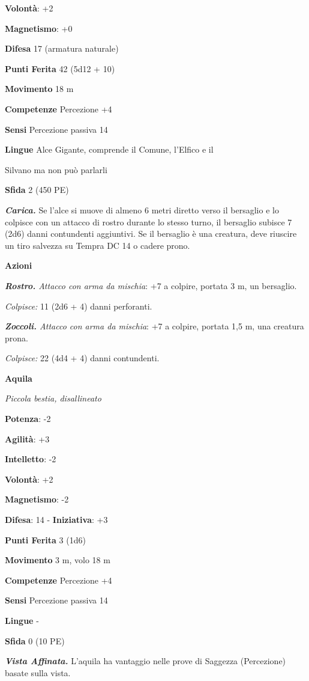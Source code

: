\begin{multicols}{2}
\textbf{Volontà}: +2

\textbf{Magnetismo}: +0

\textbf{Difesa} 17 (armatura naturale)

\textbf{Punti Ferita} 42 (5d12 + 10)

\textbf{Movimento} 18 m

\textbf{Competenze} Percezione +4

\textbf{Sensi} Percezione passiva 14

\textbf{Lingue} Alce Gigante, comprende il Comune, l'Elfico e il

Silvano ma non può parlarli

\textbf{Sfida} 2 (450 PE)

\emph{\textbf{Carica.}} Se l'alce si muove di almeno 6 metri diretto
verso il bersaglio e lo colpisce con un attacco di rostro durante lo
stesso turno, il bersaglio subisce 7 (2d6) danni contundenti aggiuntivi.
Se il bersaglio è una creatura, deve riuscire un tiro salvezza su Tempra
DC 14 o cadere prono.

\textbf{Azioni}

\emph{\textbf{Rostro.} Attacco con arma da mischia}: +7 a colpire,
portata 3 m, un bersaglio.

\emph{Colpisce:} 11 (2d6 + 4) danni perforanti.

\emph{\textbf{Zoccoli.} Attacco con arma da mischia}: +7 a colpire,
portata 1,5 m, una creatura prona.

\emph{Colpisce:} 22 (4d4 + 4) danni contundenti.

\textbf{Aquila}

\emph{Piccola bestia, disallineato}

\textbf{Potenza}: -2

\textbf{Agilità}: +3

\textbf{Intelletto}: -2

\textbf{Volontà}: +2

\textbf{Magnetismo}: -2

\textbf{Difesa}: 14 - \textbf{Iniziativa}: +3

\textbf{Punti Ferita} 3 (1d6)

\textbf{Movimento} 3 m, volo 18 m

\textbf{Competenze} Percezione +4

\textbf{Sensi} Percezione passiva 14

\textbf{Lingue} -

\textbf{Sfida} 0 (10 PE)

\emph{\textbf{Vista Affinata.}} L'aquila ha vantaggio nelle prove di
Saggezza (Percezione) basate sulla vista.


\end{multicols}
